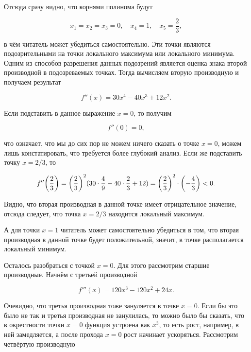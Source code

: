 \documentclass[12pt]{article}
\begin{document}
Отсюда сразу видно, что корнями полинома будут

\begin{equation}
	x_1 = x_2 = x_3 = 0,\quad x_4 = 1, \quad x_5 = \dfrac{2}{3},
\end{equation}

в чём читатель может убедиться самостоятельно. Эти точки являются подозрительными на точки локального максимума или локального минимума. Одним из способов разрешения данных подозрений является оценка знака второй производной в подозреваемых точках. Тогда вычисляем вторую производную и получаем результат

\begin{equation}
	f''(x) = 30 x^4 -40x^3+12x^2. 
\end{equation}

Если подставить в данное выражение $x=0$, то получим 

\begin{equation}
	f''(0) = 0,
\end{equation}

что означает, что мы до сих пор не можем ничего сказать о точке $x=0$, можем лишь констатировать, что требуется более глубокий анализ. Если же подставить точку $x=2/3$, то 

\begin{equation}
	f''\qty(\dfrac{2}{3}) = \qty(\dfrac{2}{3})^2(30 \cdot \dfrac{4}{9} - 40 \cdot \dfrac{2}{3} + 12) = \qty(\dfrac{2}{3})^2 \cdot \qty(-\dfrac{4}{3}) < 0.
\end{equation}

Видно, что вторая производная в данной точке имеет отрицательное значение, отсюда следует, что точка $x=2/3$ находится локальный максимум.

\par А для точки $x=1$ читатель может самостоятельно убедиться в том, что вторая производная в данной точке будет положительной, значит, в точке располагается локальный минимум.

\par Осталось разобраться с точкой $x=0$. Для этого рассмотрим старшие производные. Начнём с третьей производной

\begin{equation}
	f'''(x) = 120 x^3 - 120x^2 + 24x.
\end{equation}

Очевидно, что третья производная тоже зануляется в точке $x=0$. Если бы это было не так и третья производная не занулилась, то можно было бы сказать, что в окрестности точки $x=0$ функция устроена как $x^3$, то есть рост, например, в ней замедляется, а после прохода $x=0$ рост начинает ускоряться. Рассмотрим четвёртую производную
\end{document}
